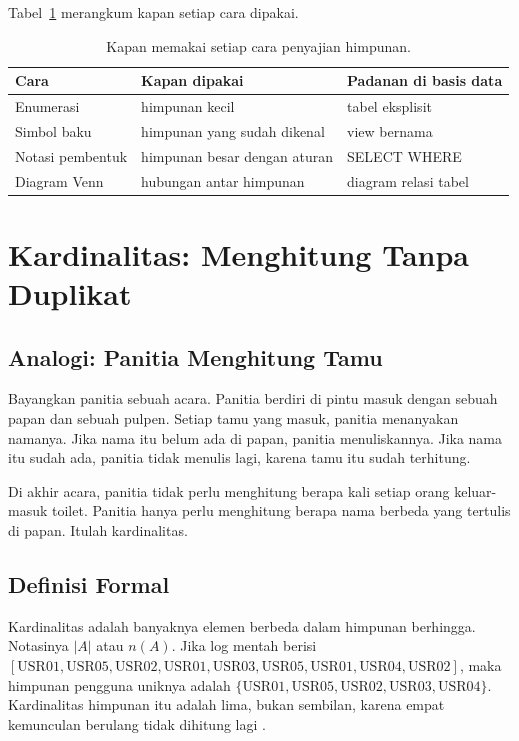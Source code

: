 \documentclass[11pt,a4paper]{article}
\begin{document}
Tabel~\ref{tab:penyajian} merangkum kapan setiap cara dipakai.

\begin{table}[H]
	\centering
	\caption{Kapan memakai setiap cara penyajian himpunan.}
	\label{tab:penyajian}
	\small
	\begin{tabularx}{\textwidth}{l X X}
		\toprule
		Cara             & Kapan dipakai                & Padanan di basis data \\
		\midrule
		Enumerasi        & himpunan kecil               & tabel eksplisit       \\
		Simbol baku      & himpunan yang sudah dikenal  & view bernama          \\
		Notasi pembentuk & himpunan besar dengan aturan & SELECT WHERE          \\
		Diagram Venn     & hubungan antar himpunan      & diagram relasi tabel  \\
		\bottomrule
	\end{tabularx}
\end{table}

\section{Kardinalitas: Menghitung Tanpa Duplikat}

\subsection{Analogi: Panitia Menghitung Tamu}

Bayangkan panitia sebuah acara. Panitia berdiri di pintu masuk dengan sebuah papan dan sebuah pulpen. Setiap tamu yang masuk, panitia menanyakan namanya. Jika nama itu belum ada di papan, panitia menuliskannya. Jika nama itu sudah ada, panitia tidak menulis lagi, karena tamu itu sudah terhitung.

Di akhir acara, panitia tidak perlu menghitung berapa kali setiap orang keluar-masuk toilet. Panitia hanya perlu menghitung berapa nama berbeda yang tertulis di papan. Itulah kardinalitas.

\subsection{Definisi Formal}

Kardinalitas adalah banyaknya elemen berbeda dalam himpunan berhingga. Notasinya $|A|$ atau $n(A)$. Jika log mentah berisi $[\text{USR01},\text{USR05},\text{USR02},\text{USR01},\text{USR03},\text{USR05},\text{USR01},\text{USR04},\text{USR02}]$, maka himpunan pengguna uniknya adalah $\{\text{USR01},\text{USR05},\text{USR02},\text{USR03},\text{USR04}\}$. Kardinalitas himpunan itu adalah lima, bukan sembilan, karena empat kemunculan berulang tidak dihitung lagi \cite{rosen}.
\end{document}
